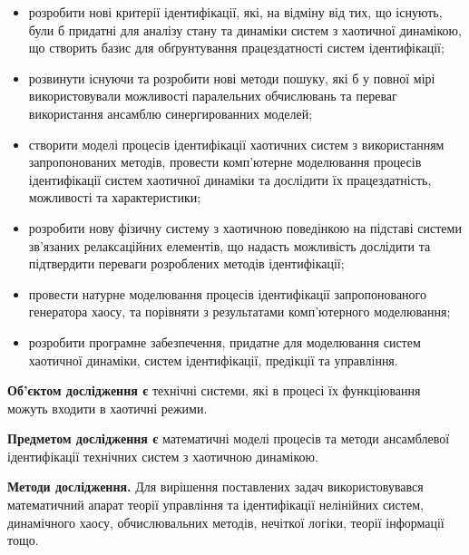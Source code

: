 \documentclass[a4paper,13pt]{atuaref}
\begin{document}
\begin{itemize}

  \item
  розробити нові критерії ідентифікації, які, на відміну від тих, що
  існують, були б придатні для аналізу стану та динаміки
  систем з хаотичної динамікою, що створить базис для обґрунтування працездатності систем
  ідентифікації;

  \item
  розвинути існуючи та розробити нові методи пошуку, які б
  у повної мірі використовували можливості
  паралельних обчислювань та переваг використання ансамблю
  синергированних моделей;


  \item
  створити моделі процесів
  ідентифікації хаотичних систем з використанням запропонованих методів,
  провести комп'ютерне моделювання процесів ідентифікації систем
  хаотичної динаміки та дослідити їх працездатність, можливості та
  характеристики;

  \item
  розробити нову фізичну систему з хаотичною поведінкою
  на підставі системи зв'язаних релаксаційних елементів,
  що надасть можливість дослідити та підтвердити переваги
  розроблених методів ідентифікації;

  \item
  провести натурне моделювання процесів ідентифікації запропонованого
  генератора хаосу, та порівняти з результатами комп'ютерного моделювання;

  \item
  розробити програмне забезпечення, придатне для моделювання систем
  хаотичної динаміки, систем ідентифікації, предікції та управління.

\end{itemize}


\textbf{Об'єктом дослідження є}
технічні системи, які в процесі їх функціювання можуть
входити в хаотичні режими.

\smallskip
\textbf{Предметом дослідження є}
математичні моделі процесів та методи
ансамблевої ідентифікації технічних систем з хаотичною динамікою.

\smallskip
\textbf{Методи дослідження.}
Для вирішення поставлених задач використовувався математичний апарат
теорії управління та ідентифікації нелінійних систем, динамічного хаосу,
обчислювальних методів, нечіткої логіки, теорії інформації тощо.
\end{document}

